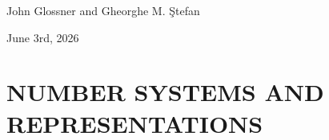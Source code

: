 \documentclass[11pt]{book}
\begin{document}
\vspace{\baselineskip}\par \noindent
John Glossner and Gheorghe M. \c{S}tefan
\vspace{\baselineskip}\par \noindent
June 3rd, 2026

%



\newpage
\renewcommand*\contentsname{Contents (detailed)}
\setcounter{secnumdepth}{3}
\setcounter{tocdepth}{4}
\tableofcontents

\listoffigures

\listoftables

\lstlistoflistings



\mainmatter
{}

\setcounter{tocdepth}{3}%
\setcounter{secnumdepth}{3}
\etocsettocstyle{}{} %


\renewcommand*{\indexname}{Index and Glossary}

\newtheorem{theorem}{Theorem}[chapter]
\newtheorem{exemplu}{Example}[chapter]
\newtheorem{definition}{Definition}[chapter]
\newtheorem{problem}{Problem}[chapter]
\newtheorem{project}{Project}[chapter]
\newtheorem{simulation}{VeriSim}[chapter]
\newtheorem{verisum}{SystemVerilogSummary}%
\newtheorem{corollary}{Corollary}[chapter]
\newtheorem{proof}{Proof}[chapter]


\part{NUMBER SYSTEMS AND REPRESENTATIONS}







\end{document}
